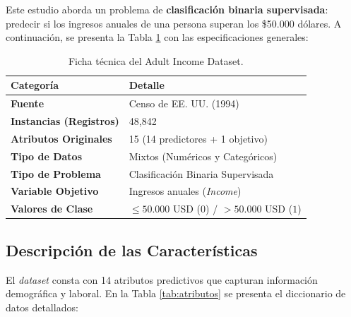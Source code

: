 \documentclass[a4paper,10pt]{book}
\begin{document}
			Este estudio aborda un problema de \textbf{clasificación binaria supervisada}: predecir si los ingresos anuales de una persona superan los \$50.000 dólares. A continuación, se presenta la Tabla \ref{tab:ficha_tecnica} con las especificaciones generales:
			
			\begin{table}[H]
				\centering
				\begin{tabular}{|l|l|}
					\hline
					\rowcolor{TPcolor} 
					\textbf{Categoría} & \textbf{Detalle} \\ \hline
					\textbf{Fuente} & Censo de EE. UU. (1994) \\ \hline
					\textbf{Instancias (Registros)} & 48,842 \\ \hline
					\textbf{Atributos Originales} & 15 (14 predictores + 1 objetivo) \\ \hline
					\textbf{Tipo de Datos} & Mixtos (Numéricos y Categóricos) \\ \hline
					\textbf{Tipo de Problema} & Clasificación Binaria Supervisada \\ \hline
					\textbf{Variable Objetivo} & Ingresos anuales (\textit{Income}) \\ \hline
					\textbf{Valores de Clase} & $\le 50.000$ USD ($0$) / $> 50.000$ USD ($1$) \\ \hline
				\end{tabular}
				\caption{Ficha técnica del Adult Income Dataset.}
				\label{tab:ficha_tecnica}
			\end{table}
			
	\subsection{Descripción de las Características}
	
		El \textit{dataset} consta con 14 atributos predictivos que capturan información demográfica y laboral. En la Tabla \ref{tab:atributos} se presenta el diccionario de datos detallados:
		
\end{document}
